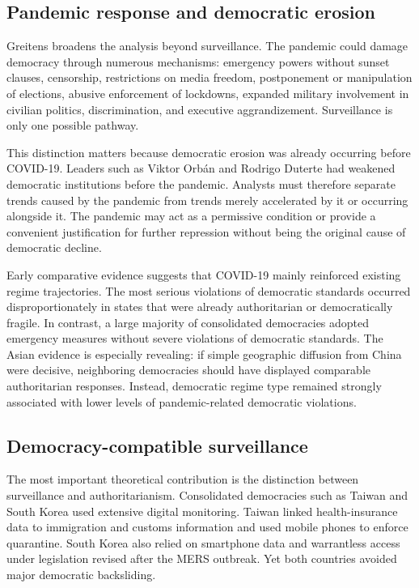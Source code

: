 \subsection{Pandemic response and democratic erosion}

Greitens broadens the analysis beyond surveillance. The pandemic could damage democracy through numerous mechanisms: emergency powers without sunset clauses, censorship, restrictions on media freedom, postponement or manipulation of elections, abusive enforcement of lockdowns, expanded military involvement in civilian politics, discrimination, and executive aggrandizement. Surveillance is only one possible pathway.

This distinction matters because democratic erosion was already occurring before COVID-19. Leaders such as Viktor Orbán and Rodrigo Duterte had weakened democratic institutions before the pandemic. Analysts must therefore separate trends caused by the pandemic from trends merely accelerated by it or occurring alongside it. The pandemic may act as a permissive condition or provide a convenient justification for further repression without being the original cause of democratic decline.

Early comparative evidence suggests that COVID-19 mainly reinforced existing regime trajectories. The most serious violations of democratic standards occurred disproportionately in states that were already authoritarian or democratically fragile. In contrast, a large majority of consolidated democracies adopted emergency measures without severe violations of democratic standards. The Asian evidence is especially revealing: if simple geographic diffusion from China were decisive, neighboring democracies should have displayed comparable authoritarian responses. Instead, democratic regime type remained strongly associated with lower levels of pandemic-related democratic violations.

\subsection{Democracy-compatible surveillance}

The most important theoretical contribution is the distinction between surveillance and authoritarianism. Consolidated democracies such as Taiwan and South Korea used extensive digital monitoring. Taiwan linked health-insurance data to immigration and customs information and used mobile phones to enforce quarantine. South Korea also relied on smartphone data and warrantless access under legislation revised after the MERS outbreak. Yet both countries avoided major democratic backsliding.

